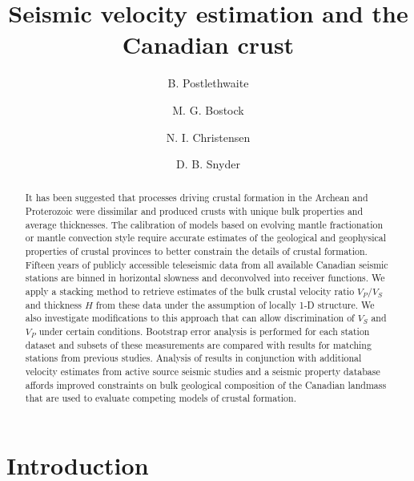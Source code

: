 \documentclass[review]{elsarticle}
\begin{document}
\begin{frontmatter}

\title{Seismic velocity estimation and the Canadian crust}

\author[ubc]{B. Postlethwaite}
\author[ubc]{M. G. Bostock}
\author[ubc]{N. I. Christensen}
\author[gsc]{D. B. Snyder}


\address[ubc]{Earth and Ocean Sciences, UBC, Vancouver BC, Canada}
\address[gsc]{Geological Survey Canada, Natural Resources Canada, Ottawa ON, Canada}

\begin{abstract}
It has been suggested that processes driving crustal formation in the Archean and Proterozoic were dissimilar and produced crusts with unique bulk properties and average thicknesses. The calibration of models based on evolving mantle fractionation or mantle convection style require accurate estimates of the geological and geophysical properties of crustal provinces to better constrain the details of crustal formation. Fifteen years of publicly accessible teleseismic data from all available Canadian seismic stations are binned in horizontal slowness and deconvolved into receiver functions. We apply a stacking method to retrieve estimates of the bulk crustal velocity ratio $V_P/V_S$ and thickness $H$ from these data under the assumption of locally 1-D structure. We also investigate modifications to this approach that can allow discrimination of $V_S$ and $V_P$ under certain conditions. Bootstrap error analysis is performed for each station dataset and subsets of these measurements are compared with results for matching stations from previous studies. Analysis of results in conjunction with additional velocity estimates from active source seismic studies and a seismic property database affords improved constraints on bulk geological composition of the Canadian landmass that are used to evaluate competing models of crustal formation.
\end{abstract}

\end{frontmatter}
\section{Introduction}
\end{document}

